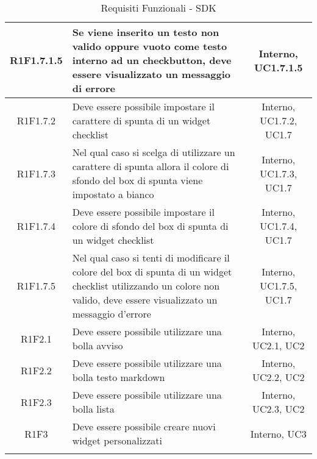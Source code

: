 \begin{longtable}{|c|>{\centering}m{7cm}|c|}
		\hline
		R1F1.7.1.5 & Se viene inserito un testo non valido oppure vuoto come testo interno ad un checkbutton, deve essere visualizzato un messaggio di errore & Interno, UC1.7.1.5\\
		\hline
		R1F1.7.2 & Deve essere possibile impostare il carattere di spunta di un widget checklist & Interno, UC1.7.2, UC1.7 \\
		\hline
		R1F1.7.3 & Nel qual caso si scelga di utilizzare un carattere di spunta allora il colore di sfondo del box di spunta viene impostato a bianco & Interno, UC1.7.3, UC1.7 \\
		\hline
		R1F1.7.4 & Deve essere possibile impostare il colore di sfondo del box di spunta di un widget checklist & Interno, UC1.7.4, UC1.7 \\
		\hline
		R1F1.7.5 & Nel qual caso si tenti di modificare il colore del box di spunta di un widget checklist utilizzando un colore non valido, deve essere visualizzato un messaggio d'errore & Interno, UC1.7.5, UC1.7 \\			
			\hline
			R1F2.1 & Deve essere possibile utilizzare una bolla avviso & Interno, UC2.1, UC2 \\
			\hline
			R1F2.2 & Deve essere possibile utilizzare una bolla testo markdown & Interno, UC2.2, UC2 \\
			\hline
			R1F2.3 & Deve essere possibile utilizzare una bolla lista & Interno, UC2.3, UC2 \\
			\hline
			R1F3 & Deve essere possibile creare nuovi widget personalizzati & Interno, UC3 \\
			\hline
\caption[Requisiti Funzionali - SDK]{Requisiti Funzionali - SDK}
\label{tabella: Requisiti Funzionali - SDK}
\end{longtable}
\endgroup
\clearpage
